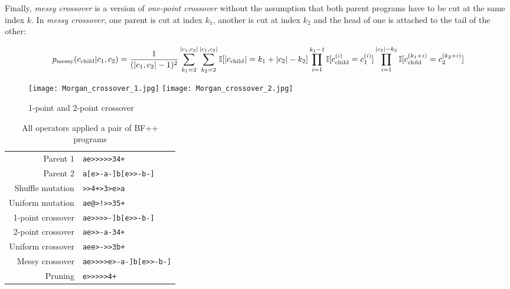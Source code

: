 Finally, \emph{messy crossover} is a version of \emph{one-point crossover} without the assumption that both parent programs have to be cut at the same index $k$.
In \emph{messy crossover}, one parent is cut at index $k_1$, another is cut at index $k_2$ and the head of one is attached to the tail of the other:

\begin{equation}
    p_\text{messy}(c_\text{child}|c_1,c_2) =
        \frac{1}{(|c_1,c_2|-1)^2}
        \sum\limits_{k_1=2}^{|c_1,c_2|} \sum\limits_{k_2=2}^{|c_1,c_2|} \\ \mathbb{I}[|c_\text{child}|=k_1+|c_2|-k_2] \\ \prod\limits_{i=1}^{k_1-1} \mathbb{I}[c_\text{child}^{(i)} = c_1^{(i)}] \prod\limits_{i=1}^{|c_2|-k_2} \mathbb{I}[c_\text{child}^{(k_1+i)} = c_2^{(k_2+i)}]
\end{equation}

\begin{figure}
    \centering
    \texttt{[image: Morgan\_crossover\_1.jpg]}
    \texttt{[image: Morgan\_crossover\_2.jpg]}
    \caption{1-point and 2-point crossover \cite{evocritique}}
    \label{fig:crossover}
\end{figure}

\begin{table}
    \begin{tabular}{r|l}
         Parent 1 & \color{blue}\verb|ae>>>>>34+| \\
         Parent 2 & \color{red}\verb|a[e>-a-]b[e>>-b-]| \\
         \midrule
         Shuffle mutation & \color{blue}\verb|>>4+>3>e>a| \\
         Uniform mutation & \color{blue}\verb|ae|\color{black}\verb|@|\color{blue}\verb|>|\color{black}\verb|!|\color{blue}\verb|>>3|\color{black}\verb|5|\color{blue}\verb|+| \\
         1-point crossover & \color{blue}\verb|ae>>>>|\color{red}\verb|-]b[e>>-b-]| \\
         2-point crossover & \color{blue}\verb|ae>|\color{red}\verb|>-a-|\color{blue}\verb|34+| \\
         Uniform crossover & \color{blue}\verb|ae|\color{red}\verb|e|\color{blue}\verb|>|\color{red}\verb|-|\color{blue}\verb|>>3|\color{red}\verb|b|\color{blue}\verb|+| \\
         Messy crossover & \color{blue}\verb|ae>>>>|\color{red}\verb|e>-a-]b[e>>-b-]| \\
         Pruning & \color{blue}\verb|e>>>>>4+| \\
    \end{tabular}
    \caption{All operators applied a pair of BF++ \cite{bf++} programs}
\end{table}


